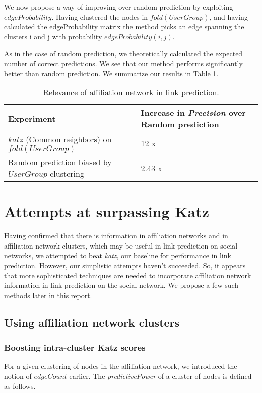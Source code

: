 \documentclass{report}
\begin{document}
We now propose a way of improving over random prediction by exploiting $edgeProbability$. Having clustered the nodes in $fold(UserGroup)$, and having calculated the edgeProbability matrix the method picks an edge spanning the clusters i and j with probability $edgeProbability(i, j)$.

As in the case of random prediction, we theoretically calculated the expected number of correct predictions. We see that our method performs significantly better than random prediction. We summarize our results in Table \ref{tab:confirmation}.

\begin{table}
\centering
\begin{tabular}{| p{6cm} |  p{4cm} |}
\hline
Experiment& Increase in \textit{Precision} over Random prediction\\
\hline
$katz$ (Common neighbors) on $fold(UserGroup)$&12 x\\
\hline
Random prediction biased by $UserGroup$ clustering &2.43 x\\
\hline
\end{tabular}
\caption{Relevance of affiliation network in link prediction.}
\label{tab:confirmation}
\end{table} 

\section{Attempts at surpassing Katz}
Having confirmed that there is information in affiliation networks and in affiliation network clusters, which may be useful in link prediction on social networks, we attempted to beat \textit{katz}, our baseline for performance in link prediction. However, our simplistic attempts haven't succeeded. So, it appears that more sophisticated techniques are needed to incorporate affiliation network information in link prediction on the social network. We propose a few such methods later in this report.

\subsection{Using affiliation network clusters}
\subsubsection{Boosting intra-cluster Katz scores}
For a given clustering of nodes in the affiliation network, we introduced the notion of $edgeCount$ earlier. The \textit{predictivePower} of a cluster of nodes is defined as follows.
\end{document}
